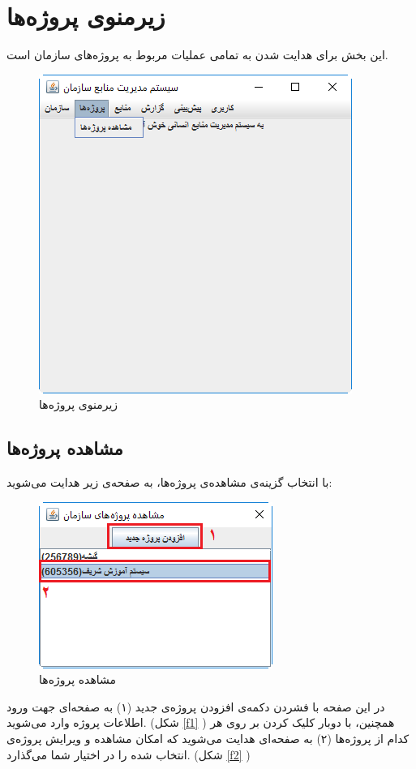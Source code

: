 \section{زیرمنوی پروژه‌ها}
این بخش برای هدایت شدن به تمامی عملیات مربوط به پروژه‌های سازمان است.
	\begin{figure}[H]
		\centering
		\includegraphics[scale=0.7]{img/manual/prjSubmenu}
		\caption{زیرمنوی پروژه‌ها}
	\end{figure}
	
\subsection{مشاهده پروژه‌ها}
با انتخاب گزینه‌ی مشاهده‌ی پروژه‌ها، به صفحه‌ی زیر هدایت می‌شوید:
	\begin{figure}[H]
		\centering
		\includegraphics[scale=0.7]{img/manual/viewProjects}
		\caption{مشاهده پروژه‌ها}
	\end{figure}
در این صفحه با فشردن دکمه‌ی افزودن پروژه‌ی جدید (۱) به صفحه‌ای جهت ورود اطلاعات پروژه وارد می‌شوید. (شکل 
\ref{f1}
 )
همچنین، با دوبار کلیک کردن بر روی هر کدام از پروژه‌ها (۲) به صفحه‌ای هدایت‌ می‌شوید که امکان مشاهده و ویرایش پروژه‌ی انتخاب شده را در اختیار شما می‌گذارد. (شکل  
\ref{f2}
 )


